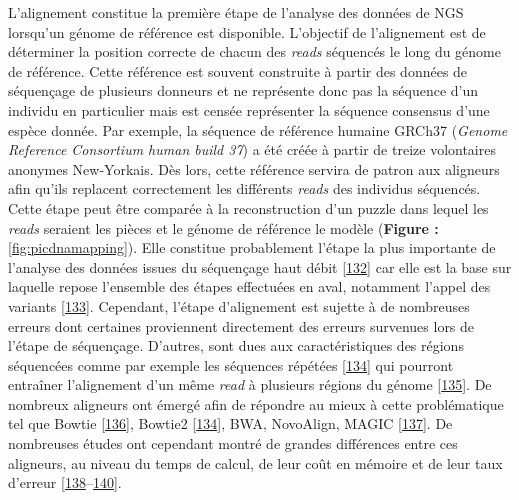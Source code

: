 \documentclass[12pt,a4paper,twoside]{ugathesis}
\theoremstyle{definition}
\theoremstyle{definition}
\theoremstyle{definition}
\theoremstyle{remark}
\begin{document}
L'alignement constitue la première étape de l'analyse des données de NGS
lorsqu'un génome de référence est disponible. L'objectif de l'alignement
est de déterminer la position correcte de chacun des \emph{reads}
séquencés le long du génome de référence. Cette référence est souvent
construite à partir des données de séquençage de plusieurs donneurs et
ne représente donc pas la séquence d'un individu en particulier mais est
censée représenter la séquence consensus d'une espèce donnée. Par
exemple, la séquence de référence humaine GRCh37 (\emph{Genome Reference
Consortium human build 37}) a été créée à partir de treize volontaires
anonymes New-Yorkais. Dès lors, cette référence servira de patron aux
aligneurs afin qu'ils replacent correctement les différents \emph{reads}
des individus séquencés. Cette étape peut être comparée à la
reconstruction d'un puzzle dans lequel les \emph{reads} seraient les
pièces et le génome de référence le modèle (\textbf{Figure :
}\ref{fig:picdnamapping}). Elle constitue probablement l'étape la plus
importante de l'analyse des données issues du séquençage haut débit
{[}\protect\hyperlink{ref-Flicek2009}{132}{]} car elle est la base sur
laquelle repose l'ensemble des étapes effectuées en aval, notamment
l'appel des variants {[}\protect\hyperlink{ref-Nielsen2011}{133}{]}.
Cependant, l'étape d'alignement est sujette à de nombreuses erreurs dont
certaines proviennent directement des erreurs survenues lors de l'étape
de séquençage. D'autres, sont dues aux caractéristiques des régions
séquencées comme par exemple les séquences répétées
{[}\protect\hyperlink{ref-Langmead2012}{134}{]} qui pourront entraîner
l'alignement d'un même \emph{read} à plusieurs régions du génome
{[}\protect\hyperlink{ref-Treangen2013}{135}{]}. De nombreux aligneurs
ont émergé afin de répondre au mieux à cette problématique tel que
Bowtie {[}\protect\hyperlink{ref-Langmead2009}{136}{]}, Bowtie2
{[}\protect\hyperlink{ref-Langmead2012}{134}{]}, BWA, NovoAlign, MAGIC
{[}\protect\hyperlink{ref-Su2014}{137}{]}. De nombreuses études ont
cependant montré de grandes différences entre ces aligneurs, au niveau
du temps de calcul, de leur coût en mémoire et de leur taux d'erreur
{[}\protect\hyperlink{ref-Ruffalo2011}{138}--\protect\hyperlink{ref-Bao2011}{140}{]}.

\newpage
\end{document}
